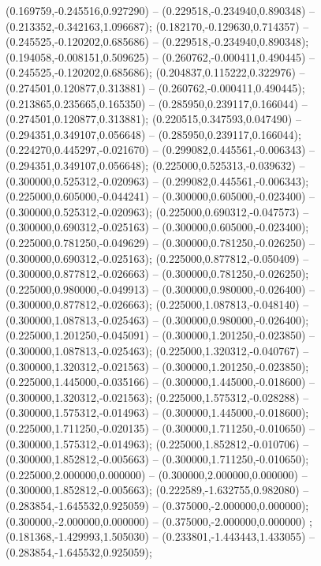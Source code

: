  (0.169759,-0.245516,0.927290) -- (0.229518,-0.234940,0.890348) -- (0.213352,-0.342163,1.096687);
 (0.182170,-0.129630,0.714357) -- (0.245525,-0.120202,0.685686) -- (0.229518,-0.234940,0.890348);
 (0.194058,-0.008151,0.509625) -- (0.260762,-0.000411,0.490445) -- (0.245525,-0.120202,0.685686);
 (0.204837,0.115222,0.322976) -- (0.274501,0.120877,0.313881) -- (0.260762,-0.000411,0.490445);
 (0.213865,0.235665,0.165350) -- (0.285950,0.239117,0.166044) -- (0.274501,0.120877,0.313881);
 (0.220515,0.347593,0.047490) -- (0.294351,0.349107,0.056648) -- (0.285950,0.239117,0.166044);
 (0.224270,0.445297,-0.021670) -- (0.299082,0.445561,-0.006343) -- (0.294351,0.349107,0.056648);
 (0.225000,0.525313,-0.039632) -- (0.300000,0.525312,-0.020963) -- (0.299082,0.445561,-0.006343);
 (0.225000,0.605000,-0.044241) -- (0.300000,0.605000,-0.023400) -- (0.300000,0.525312,-0.020963);
 (0.225000,0.690312,-0.047573) -- (0.300000,0.690312,-0.025163) -- (0.300000,0.605000,-0.023400);
 (0.225000,0.781250,-0.049629) -- (0.300000,0.781250,-0.026250) -- (0.300000,0.690312,-0.025163);
 (0.225000,0.877812,-0.050409) -- (0.300000,0.877812,-0.026663) -- (0.300000,0.781250,-0.026250);
 (0.225000,0.980000,-0.049913) -- (0.300000,0.980000,-0.026400) -- (0.300000,0.877812,-0.026663);
 (0.225000,1.087813,-0.048140) -- (0.300000,1.087813,-0.025463) -- (0.300000,0.980000,-0.026400);
 (0.225000,1.201250,-0.045091) -- (0.300000,1.201250,-0.023850) -- (0.300000,1.087813,-0.025463);
 (0.225000,1.320312,-0.040767) -- (0.300000,1.320312,-0.021563) -- (0.300000,1.201250,-0.023850);
 (0.225000,1.445000,-0.035166) -- (0.300000,1.445000,-0.018600) -- (0.300000,1.320312,-0.021563);
 (0.225000,1.575312,-0.028288) -- (0.300000,1.575312,-0.014963) -- (0.300000,1.445000,-0.018600);
 (0.225000,1.711250,-0.020135) -- (0.300000,1.711250,-0.010650) -- (0.300000,1.575312,-0.014963);
 (0.225000,1.852812,-0.010706) -- (0.300000,1.852812,-0.005663) -- (0.300000,1.711250,-0.010650);
 (0.225000,2.000000,0.000000) -- (0.300000,2.000000,0.000000) -- (0.300000,1.852812,-0.005663);
 (0.222589,-1.632755,0.982080) -- (0.283854,-1.645532,0.925059) -- (0.375000,-2.000000,0.000000);
 (0.300000,-2.000000,0.000000) -- (0.375000,-2.000000,0.000000) ;
 (0.181368,-1.429993,1.505030) -- (0.233801,-1.443443,1.433055) -- (0.283854,-1.645532,0.925059);
